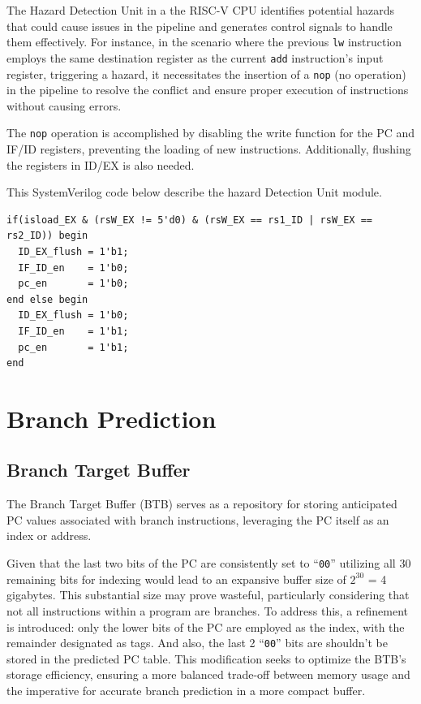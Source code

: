 \documentclass[12pt,a4paper,oneside]{book} %
\begin{document}
The Hazard Detection Unit in a the RISC-V CPU identifies potential hazards that could cause issues in the pipeline and generates control signals to handle them effectively. For instance, in the scenario where the previous \texttt{lw} instruction employs the same destination register as the current \texttt{add} instruction's input register, triggering a hazard, it necessitates the insertion of a \texttt{nop} (no operation) in the pipeline to resolve the conflict and ensure proper execution of instructions without causing errors.

The \texttt{nop} operation is accomplished by disabling the write function for the PC and IF/ID registers, preventing the loading of new instructions. Additionally, flushing the registers in ID/EX is also needed. 

This SystemVerilog code below describe the hazard Detection Unit module.
\begin{verbatim}
if(isload_EX & (rsW_EX != 5'd0) & (rsW_EX == rs1_ID | rsW_EX == rs2_ID)) begin
  ID_EX_flush = 1'b1;
  IF_ID_en    = 1'b0;
  pc_en       = 1'b0;
end else begin
  ID_EX_flush = 1'b0;
  IF_ID_en    = 1'b1;
  pc_en       = 1'b1;
end
\end{verbatim}

\section{Branch Prediction}
\subsection{Branch Target Buffer}

The Branch Target Buffer (BTB) serves as a repository for storing anticipated PC values associated with branch instructions, leveraging the PC itself as an index or address. 

Given that the last two bits of the PC are consistently set to ``\texttt{00}'' utilizing all 30 remaining bits for indexing would lead to an expansive buffer size of $2^{30}$ = 4 gigabytes. This substantial size may prove wasteful, particularly considering that not all instructions within a program are branches. To address this, a refinement is introduced: only the lower bits of the PC are employed as the index, with the remainder designated as tags. And also, the last 2 ``\texttt{00}'' bits are shouldn't be stored in the predicted PC table. This modification seeks to optimize the BTB's storage efficiency, ensuring a more balanced trade-off between memory usage and the imperative for accurate branch prediction in a more compact buffer.
\end{document}
